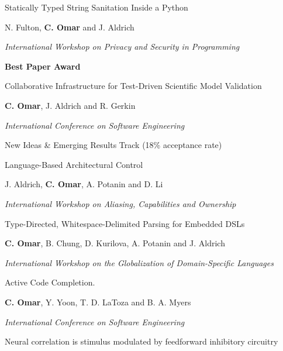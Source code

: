 \documentclass[10pt,letterpaper]{article}
\renewenvironment{itemize}{
  \begin{list}{}{
    \setlength{\leftmargin}{1.25em}
    \setlength{\itemsep}{0.25em}
    \setlength{\parskip}{0pt}
    \setlength{\parsep}{0.2em}
  }
}{
  \end{list}
}
\begin{document}
\begin{enumerate}[leftmargin=*, labelindent=6.5em, font=\bfseries]
\begin{itemize}
        \end{itemize}
  \item[PSP 2014] Statically Typed String Sanitation Inside a Python
        \begin{itemize}
          \item N. Fulton, \textbf{C. Omar} and J. Aldrich
          \item \textit{International Workshop on Privacy and Security in Programming}
          \item \textbf{Best Paper Award}
        \end{itemize}
  \item[ICSE 2014] Collaborative Infrastructure for Test-Driven Scientific Model Validation
        \begin{itemize}
          \item \textbf{C. Omar}, J. Aldrich and R. Gerkin
          \item \textit{International Conference on Software Engineering}
          \item New Ideas \& Emerging Results Track (18\% acceptance rate)
        \end{itemize}
  \item[IWACO 2014] Language-Based Architectural Control
        \begin{itemize}
          \item J. Aldrich, \textbf{C. Omar}, A. Potanin and D. Li
          \item \textit{International Workshop on Aliasing, Capabilities and Ownership}
        \end{itemize}
  \item[GlobalDSL 2013] Type-Directed, Whitespace-Delimited Parsing for Embedded DSLs
        \begin{itemize}
          \item \textbf{C. Omar}, B. Chung, D. Kurilova, A. Potanin and J. Aldrich
          \item \textit{International Workshop on the Globalization of Domain-Specific Languages}
        \end{itemize}
  \item[ICSE 2012] {Active Code Completion}.
        \begin{itemize}
          \item \textbf{C. Omar}, Y. Yoon, T. D. LaToza and B. A. Myers
          \item \textit{International Conference on Software Engineering}
        \end{itemize}
  \item[J. Neuro. 2012] {Neural correlation is stimulus modulated by feedforward inhibitory circuitry}

\end{enumerate}
\end{document}

